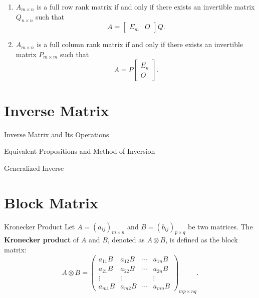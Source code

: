 \documentclass[11pt]{../../TexTemplate/elegantbook} %
\begin{document}
\begin{property}
    \begin{enumerate}
        \item \(A_{m\times n}\) is a full row rank matrix if and only if 
            there exists an invertible matrix \(Q_{n\times n}\) such that 
            \[A = \begin{bmatrix} E_{m} & O \end{bmatrix}Q.\]
        \item \(A_{m\times n}\) is a full column rank matrix if and only if 
            there exists an invertible matrix \(P_{m\times m}\) such that 
            \[A = P\begin{bmatrix} E_{n} \\ O \end{bmatrix}.\]
    \end{enumerate}
\end{property}

\section{Inverse Matrix}
\begin{leftbarTitle}{Inverse Matrix and Its Operations}\end{leftbarTitle}

\begin{leftbarTitle}{Equivalent Propositions and Method of Inversion}\end{leftbarTitle}

\begin{leftbarTitle}{Generalized Inverse}\end{leftbarTitle}

\section{Block Matrix}



\begin{definition}{Kronecker Product}
    Let \( A = (a_{ij})_{m \times n} \) and \( B = (b_{ij})_{p \times q} \) be two matrices. 
    The \textbf{Kronecker product} of \( A \) and \( B \), denoted as \( A \otimes B \), 
    is defined as the block matrix:
    \[
    A \otimes B = 
    \begin{pmatrix}
    a_{11}B & a_{12}B & \cdots & a_{1n}B \\
    a_{21}B & a_{22}B & \cdots & a_{2n}B \\
    \vdots & \vdots & & \vdots \\
    a_{m1}B & a_{m2}B & \cdots & a_{mn}B
    \end{pmatrix}_{mp \times nq}.
    \]
\end{definition}
\end{document}
